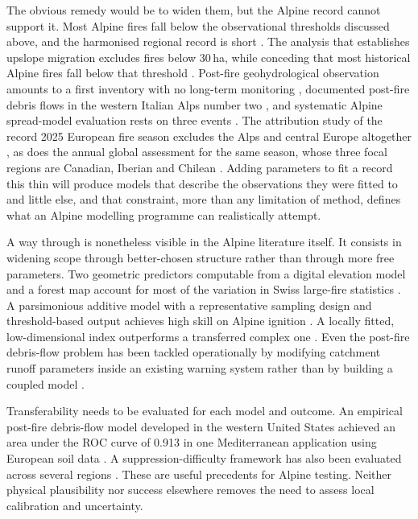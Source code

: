 \documentclass[11pt,a4paper]{article}
\begin{document}
The obvious remedy would be to widen them, but the Alpine record cannot support it. Most Alpine fires fall below the observational thresholds discussed above, and the harmonised regional record is short \citep{muller_forest_2020}. The analysis that establishes upslope migration excludes fires below 30\,ha, while conceding that most historical Alpine fires fall below that threshold \citep{beloiu_climatedriven_2026}. Post-fire geohydrological observation amounts to a first inventory with no long-term monitoring \citep{melzner_wildfire-induced_2025}, documented post-fire debris flows in the western Italian Alps number two \citep{tiranti_wildfires_2021}, and systematic Alpine spread-model evaluation rests on three events \citep{malanchini_modeling_2025}. The attribution study of the record 2025 European fire season excludes the Alps and central Europe altogether \citep{keeping_attribution_2026}, as does the annual global assessment for the same season, whose three focal regions are Canadian, Iberian and Chilean \citep{burton_state_2026}. Adding parameters to fit a record this thin will produce models that describe the observations they were fitted to and little else, and that constraint, more than any limitation of method, defines what an Alpine modelling programme can realistically attempt.

A way through is nonetheless visible in the Alpine literature itself. It consists in widening scope through better-chosen structure rather than through more free parameters. Two geometric predictors computable from a digital elevation model and a forest map account for most of the variation in Swiss large-fire statistics \citep{conedera_linking_2024}. A parsimonious additive model with a representative sampling design and threshold-based output achieves high skill on Alpine ignition \citep{moreno_1_nodate}. A locally fitted, low-dimensional index outperforms a transferred complex one \citep{de_angelis_modelling_2015}. Even the post-fire debris-flow problem has been tackled operationally by modifying catchment runoff parameters inside an existing warning system rather than by building a coupled model \citep{tiranti_wildfires_2021}.

Transferability needs to be evaluated for each model and outcome. An empirical post-fire debris-flow model developed in the western United States achieved an area under the ROC curve of 0.913 in one Mediterranean application using European soil data \citep{diakakis_exploring_2023}. A suppression-difficulty framework has also been evaluated across several regions \citep{cardil_assessing_2025}. These are useful precedents for Alpine testing. Neither physical plausibility nor success elsewhere removes the need to assess local calibration and uncertainty.
\end{document}
